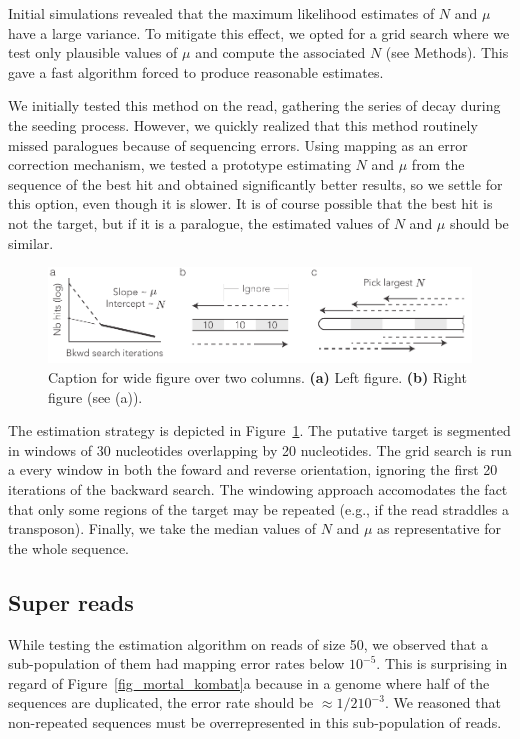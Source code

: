 \documentclass[a4,center,fleqn]{NAR}
\begin{document}
Initial simulations revealed that the maximum likelihood estimates of $N$
and $\mu$ have a large variance. To mitigate this effect, we opted for a
grid search where we test only plausible values of $\mu$ and compute the
associated $N$ (see Methods). This gave a fast algorithm forced to produce
reasonable estimates.

We initially tested this method on the read, gathering the series of decay
during the seeding process. However, we quickly realized that this method
routinely missed paralogues because of sequencing errors. Using mapping as
an error correction mechanism, we tested a prototype estimating $N$ and
$\mu$ from the sequence of the best hit and obtained significantly better
results, so we settle for this option, even though it is slower. It is of
course possible that the best hit is not the target, but if it is a
paralogue, the estimated values of $N$ and $\mu$ should be similar.

\begin{figure}[t]
\begin{center}
\includegraphics{strategy.pdf}
\end{center}
\caption{Caption for wide figure over two columns.
\textbf{(a)} Left figure.
\textbf{(b)} Right figure (see (a)).
}
\label{fig_strategy}
\end{figure}

The estimation strategy is depicted in Figure~\ref{fig_strategy}. The
putative target is segmented in windows of 30 nucleotides overlapping by
20 nucleotides. The grid search is run a every window in both the foward
and reverse orientation, ignoring the first 20 iterations of the backward
search. The windowing approach accomodates the fact that only some
regions of the target may be repeated (e.g., if the read straddles a
transposon). Finally, we take the median values of $N$ and $\mu$ as
representative for the whole sequence.


\subsection{Super reads}
\label{sec_super}

While testing the estimation algorithm on reads of size 50, we observed
that a sub-population of them had mapping error rates below $10^{-5}$.
This is surprising in regard of Figure~\ref{fig_mortal_kombat}a because in
a genome where half of the sequences are duplicated, the error rate should
be $\approx 1/2 10^{-3}$. We reasoned that non-repeated sequences must be
overrepresented in this sub-population of reads.
\end{document}
